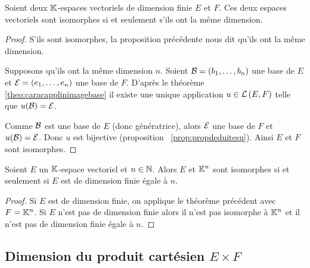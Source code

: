 \begin{theo}
  Soient deux \(\mathbb{K}\)-espaces vectoriels de dimension finie \(E\) et \(F\). Ces 
  deux espaces vectoriels sont isomorphes si et seulement s'ils ont la même 
  dimension.
\end{theo}
\begin{proof}
  S'ils sont isomorphes, la proposition précédente nous dit qu'ils ont la même 
  dimension.

  Supposons qu'ils ont la même dimension \(n\). Soient \(\mathcal{B}=(b_1, \ldots, b_n)\) 
  une base de \(E\) et \(\mathcal{E}=(e_1, \ldots, e_n)\) une base de \(F\). D'après le 
  théorème~
  \ref{theo:caracapplinimagebase} il existe une unique application \(u \in 
  \mathcal{L}\left(E,F\right)\) telle que \(u(\mathcal{B})=\mathcal{E}\).

  Comme \(\mathcal{B}\) est une base de \(E\) (donc génératrice), alors \(\mathcal{E}\) une base 
  de \(F\) et \(u(\mathcal{B})=\mathcal{E}\). Donc \(u\) est bijective (proposition~
  \ref{prop:propdeduitesu}). Ainsi \(E\) et \(F\) sont isomorphes.
\end{proof}

\begin{corth}
  Soient \(E\) un \(\mathbb{K}\)-espace vectoriel et \(n \in \mathbb{N}\). Alors \(E\) et 
  \(\mathbb{K}^n\) sont isomorphes si et seulement si \(E\) est de dimension finie égale 
  à \(n\).
\end{corth}
\begin{proof}
  Si \(E\) est de dimension finie, on applique le théorème précédent avec 
  \(F=\mathbb{K}^n\). Si \(E\) n'est pas de dimension finie alors il n'est pas isomorphe 
  à \(\mathbb{K}^n\) et il n'est pas de dimension finie égale à \(n\).
\end{proof}

\subsection{Dimension du produit cartésien \(E \times F\)}


